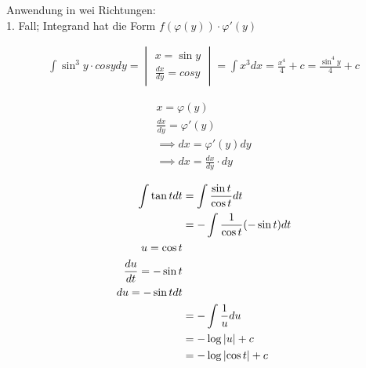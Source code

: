 Anwendung in wei Richtungen: \\
1. Fall; Integrand hat die Form $f(\varphi(y)) \cdot \varphi'(y)$ \\
\begin{bsp*}
	\begin{gather*}
		\int \sin^3 y \cdot cos y dy = \begin{vmatrix}
			x = \sin y \\
			\frac{dx}{dy} = cos y
		\end{vmatrix} = \int x^3 dx = \frac{x^4}{4} + c = \frac{\sin^4 y}{4} + c
	\end{gather*}
\end{bsp*}
\begin{bem}
	\begin{gather*}
		x = \varphi(y) \\
		\frac{dx}{dy} = \varphi'(y) \\
		\implies dx = \varphi'(y) dy \\
		\implies dx = \frac{dx}{dy} \cdot dy
	\end{gather*}
\end{bem}
\begin{bsp*}
	\begin{gather*}
		\begin{split}
			\int \tan t dt	&= \int \frac{\sin t}{\cos t} dt \\
						&= -\int \frac{1}{\cos t} ( -\sin t) dt \\
			u = \cos t \\
			\frac{du}{dt} = -\sin t \\
			du = -\sin t dt \\
						&= -\int \frac{1}{u} du \\
						&= -\log \abs{u} + c \\
						&= -\log \abs{\cos t} + c
		\end{split}
	\end{gather*}
\end{bsp*}

